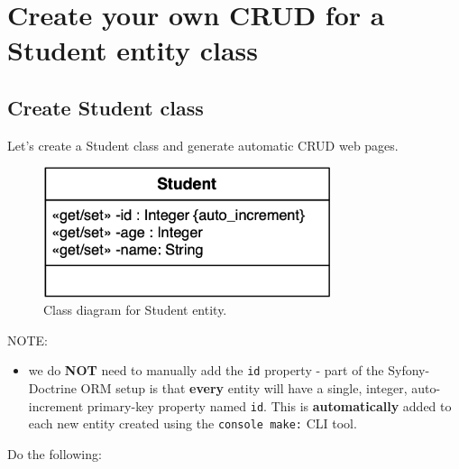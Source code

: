\documentclass[a4paperpaper,openright]{book}
\providecommand{\tightlist}{%
  \setlength{\itemsep}{0pt}\setlength{\parskip}{0pt}}
\begin{document}
\hypertarget{create-your-own-crud-for-a-student-entity-class}{%
\chapter{Create your own CRUD for a Student entity
class}\label{create-your-own-crud-for-a-student-entity-class}}

\hypertarget{create-student-class}{%
\section{Create Student class}\label{create-student-class}}

Let's create a Student class and generate automatic CRUD web pages.

\begin{figure}
\centering
\includegraphics[width=0.75\textwidth,height=\textheight]{./tex2pdf.-564b08cce17d66dc/b06182fc0ed292ee74b2047d002be6e027d35847.png}
\caption{Class diagram for Student entity.\label{student_class_diagram}}
\end{figure}

NOTE:

\begin{itemize}
\tightlist
\item
  we do \textbf{NOT} need to manually add the \texttt{id} property -
  part of the Syfony-Doctrine ORM setup is that \textbf{every} entity
  will have a single, integer, auto-increment primary-key property named
  \texttt{id}. This is \textbf{automatically} added to each new entity
  created using the \texttt{console\ make:} CLI tool.
\end{itemize}

Do the following:
\end{document}
